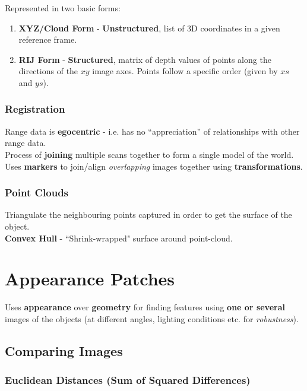 \documentclass[english, 10pt]{article}
\begin{document}
Represented in two basic forms:

\begin{enumerate}
\item \textbf{XYZ/Cloud Form} - \textbf{Unstructured}, list of 3D coordinates in a given reference frame. 
\item \textbf{RIJ Form} - \textbf{Structured}, matrix of depth values of points along the directions of the $xy$ image axes. Points follow a specific order (given by $xs$ and $ys$).
\end{enumerate}

\subsubsection{Registration}

Range data is \textbf{egocentric} - i.e. has no ``appreciation'' of relationships with other range data. \\

Process of \textbf{joining} multiple scans together to form a single model of the world. \\

Uses \textbf{markers} to join/align \textit{overlapping} images together using \textbf{transformations}.

\subsubsection{Point Clouds}

Triangulate the neighbouring points captured in order to get the surface of the object.\\

\textbf{Convex Hull }- ``Shrink-wrapped" surface around point-cloud. 

\section{Appearance Patches}

Uses \textbf{appearance} over \textbf{geometry} for finding features using \textbf{one or several} images of the objects (at different angles, lighting conditions etc. for \textit{robustness}).

\subsection{Comparing Images}

\subsubsection{Euclidean Distances (Sum of Squared Differences)}
\end{document}
